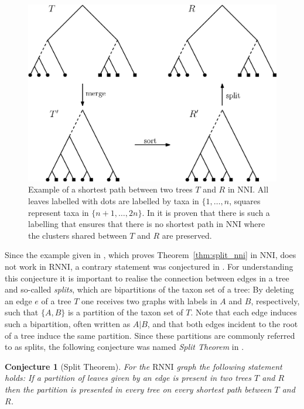 \documentclass{amsart}
\newcommand{\nni}{\mathrm{NNI}}
\newcommand{\rnni}{\mathrm{RNNI}}
\newtheorem{conjecture}[definition]{Conjecture}
\begin{document}
\begin{figure}[H]
	\centering
	\includegraphics[width=\textwidth]{NNI_NP_proof}
    \vspace{2pt}
    \caption{Example of a shortest path between two trees $T$ and $R$ in $\nni$.
    All leaves labelled with dots are labelled by taxa in $\{1, \ldots, n$, squares represent taxa in $\{n+1, \ldots, 2n\}$.
    In \autocite{Li1996-zw} it is proven that there is such a labelling that ensures that there is no shortest path in $\nni$ where the clusters shared between $T$ and $R$ are preserved.}
	\label{fig:NNI_NP_proof}
\end{figure}

Since the example given in \autocite{Li1996-zw}, which proves Theorem~\ref{thm:split_nni} in $\nni$, does not work in $\rnni$, a contrary statement was conjectured in \autocite{Gavryushkin2018-ol}.
For understanding this conjecture it is important to realise the connection between edges in a tree and so-called \emph{splits}, which are bipartitions of the taxon set of a tree:
By deleting an edge $e$ of a tree $T$ one receives two graphs with labels in $A$ and $B$, respectively, such that $\{A,B\}$ is a partition of the taxon set of $T$.
Note that each edge induces such a bipartition, often written as $A|B$, and that both edges incident to the root of a tree induce the same partition.
Since these partitions are commonly referred to as splits, the following conjecture was named \emph{Split Theorem} in \autocite{Gavryushkin2018-ol}.

\begin{conjecture}[Split Theorem]
	For the $\rnni$ graph the following statement holds:
	If a partition of leaves given by an edge is present in two trees $T$ and $R$ then the partition is presented in every tree on every shortest path between $T$ and $R$.
	\label{conjecture:split_theorem}
\end{conjecture}
\end{document}
